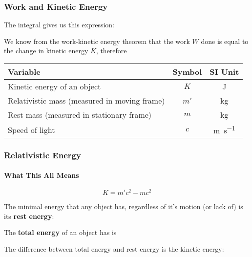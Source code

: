 \documentclass[12pt,compress,aspectratio=169]{beamer}
\newcommand{\eq}[2]{\vspace{#1}{\Large\begin{displaymath}#2\end{displaymath}}}
\begin{document}
\begin{frame}
  \frametitle{Work and Kinetic Energy}

  The integral gives us this expression:
  
  \eq{-.15in}{
    W=\gamma mc^2-mc^2 = K
  }

  \vspace{-.15in}We know from the work-kinetic energy theorem that the work $W$
  done is equal to the change in kinetic energy $K$, therefore
  
  \eq{-.2in}{ \boxed{K=m'c^2-mc^2} }

  \vspace{-.1in}
  \begin{center}
    \begin{tabular}{l|c|c}
      \rowcolor{pink}
      \textbf{Variable} & \textbf{Symbol} & \textbf{SI Unit}\\ \hline
      Kinetic energy of an object & $K$  & \si{\joule}\\
      Relativistic mass (measured in moving frame) & $m'$ & \si{\kilo\gram}\\
      Rest mass (measured in stationary frame) & $m$  & \si{\kilo\gram}\\
      Speed of light              & $c$ & \si{\metre\per\second}
    \end{tabular}
  \end{center}
\end{frame}

\begin{frame}
  \frametitle{Relativistic Energy}
  \framesubtitle{What This All Means}
  {\Large
    \begin{displaymath}
      \boxed{K=m'c^2-mc^2}
    \end{displaymath}
  }

  The minimal energy that any object has, regardless of it's motion (or lack
  of) is its \textbf{rest energy}:
  
  \eq{-.4in}{ E_0=mc^2 }

  \vspace{-.2in}The \textbf{total energy} of an object has is
    
  \eq{-.3in}{
    E_T=m'c^2=\gamma mc^2
  }

  \vspace{-.2in}The difference between total energy and rest energy is the
  kinetic energy:

  \eq{-.3in}{
    K=E_T-E_0
  }
\end{frame}
\end{document}
